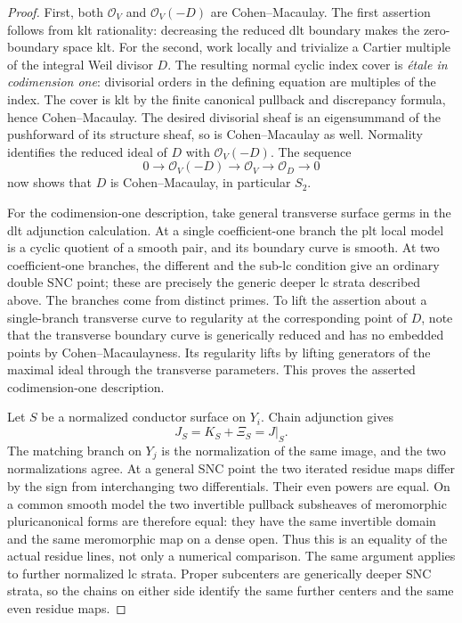 \documentclass[11pt,letterpaper]{article}
\theoremstyle{definition}
\theoremstyle{remark}
\begin{document}
\begin{proof}
First, both $\mathcal{O}_V$ and $\mathcal{O}_V(-D)$ are Cohen--Macaulay.  The first
assertion follows from klt rationality: decreasing the reduced dlt
boundary makes the zero-boundary space klt.  For the second, work
locally and trivialize a Cartier multiple of the integral Weil divisor
$D$.  The resulting normal cyclic index cover is \emph{\'etale in
codimension one}: divisorial orders in the defining equation are
multiples of the index.  The cover is klt by the finite canonical
pullback and discrepancy formula, hence Cohen--Macaulay.  The desired
divisorial sheaf is an eigensummand of the pushforward of its structure
sheaf, so is Cohen--Macaulay as well.  Normality identifies the reduced
ideal of $D$ with $\mathcal{O}_V(-D)$.  The sequence
\[
 0\longrightarrow\mathcal{O}_V(-D)\longrightarrow\mathcal{O}_V
   \longrightarrow\mathcal{O}_D\longrightarrow0
\]
now shows that $D$ is Cohen--Macaulay, in particular $S_2$.

For the codimension-one description, take general transverse surface
germs in the dlt adjunction calculation.  At a single coefficient-one
branch the plt local model is a cyclic quotient of a smooth pair, and
its boundary curve is smooth.  At two coefficient-one branches, the
different and the sub-lc condition give an ordinary double SNC point;
these are precisely the generic deeper lc strata described above.  The
branches come from distinct primes.  To lift the assertion about a
single-branch transverse curve to regularity at the corresponding
point of $D$, note that the transverse boundary curve is generically
reduced and has no embedded points by Cohen--Macaulayness.  Its
regularity lifts by lifting generators of the maximal ideal through
the transverse parameters.  This proves the asserted codimension-one
description.

Let $S$ be a normalized conductor surface on $Y_i$.  Chain adjunction
gives
\begin{equation}
 \label{floor:surface-adjunction}
 J_S=K_S+\Xi_S=J|_S.
\end{equation}
The matching branch on $Y_j$ is the normalization of the same image,
and the two normalizations agree.  At a general SNC point the two
iterated residue maps differ by the sign from interchanging two
differentials.  Their even powers are equal.  On a common smooth model
the two invertible pullback subsheaves of meromorphic pluricanonical
forms are therefore equal: they have the same invertible domain and
the same meromorphic map on a dense open.  Thus this is an equality of
the actual residue lines, not only a numerical comparison.  The same
argument applies to further normalized lc strata.  Proper subcenters
are generically deeper SNC strata, so the chains on either side
identify the same further centers and the same even residue maps.


\end{proof}
\end{document}
